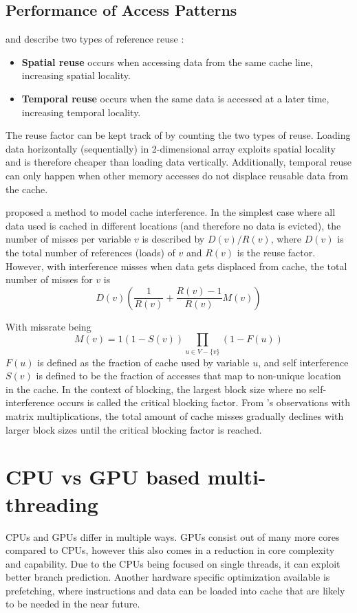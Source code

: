\subsection{Performance of Access Patterns}
\label{sec:access_patterns}
\citeauthor{lam1991cache} and \citeauthor{meyer2003algorithms} describe two types of reference reuse \cite{lam1991cache, meyer2003algorithms}:
\begin{itemize}
    \item \textbf{Spatial reuse} occurs when accessing data from the same cache line, increasing spatial locality.
    \item \textbf{Temporal reuse} occurs when the same data is accessed at a later time, increasing temporal locality.
\end{itemize}
The reuse factor can be kept track of by counting the two types of reuse.
Loading data horizontally (sequentially) in 2-dimensional array exploits spatial locality and is therefore cheaper than loading data vertically.
Additionally, temporal reuse can only happen when other memory accesses do not displace reusable data from the cache.

\citeauthor{lam1991cache} proposed a method to model cache interference.
In the simplest case where all data used is cached in different locations (and therefore no data is evicted), the number of misses per variable $v$ is described by $D(v)/R(v)$, where $D(v)$ is the total number of references (loads) of $v$ and $R(v)$ is the reuse factor.
However, with interference misses when data gets displaced from cache, the total number of misses for $v$ is
\[
    D(v)\left(\frac{1}{R(v)}+\frac{R(v)-1}{R(v)}M(v)\right)
\]

With missrate being
\[
    M(v) = 1 \left(1 - S(v)\right) \prod_{u\in V - \{v\}}\left(1 - F(u)\right)
\]
$F(u)$ is defined as the fraction of cache used by variable $u$, and self interference $S(v)$ is defined to be the fraction of accesses that map to non-unique location in the cache.
In the context of blocking, the largest block size where no self-interference occurs is called the critical blocking factor.
From \citeauthor{lam1991cache}'s observations with matrix multiplications, the total amount of cache misses gradually declines with larger block sizes until the critical blocking factor is reached.

\section{CPU vs GPU based multi-threading}
CPUs and GPUs differ in multiple ways.
GPUs consist out of many more cores compared to CPUs, however this also comes in a reduction in core complexity and capability.
Due to the CPUs being focused on single threads, it can exploit better branch prediction.
Another hardware specific optimization available is prefetching, where instructions and data can be loaded into cache that are likely to be needed in the near future.

